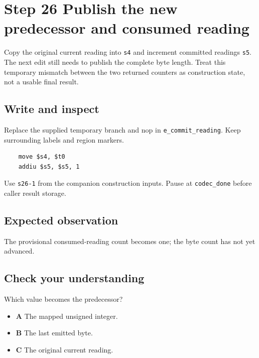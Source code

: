 \section{Step 26 Publish the new predecessor and consumed reading}\label{delta-s26}

Copy the original current reading into \texttt{s4} and increment committed readings \texttt{s5}. The next edit still needs to publish the complete byte length. Treat this temporary mismatch between the two returned counters as construction state, not a usable final result.

\subsection{Write and inspect}
Replace the supplied temporary branch and nop in \texttt{e\_commit\_reading}. Keep surrounding labels and region markers.

\begin{verbatim}
    move $s4, $t0
    addiu $s5, $s5, 1
\end{verbatim}
Use \texttt{s26-1} from the companion construction inputs. Pause at \texttt{codec\_done} before caller result storage.

\subsection{Expected observation}
The provisional consumed-reading count becomes one; the byte count has not yet advanced.

\subsection{Check your understanding}
Which value becomes the predecessor?

\begin{itemize}
  \item \textbf{A} The mapped unsigned integer.
  \item \textbf{B} The last emitted byte.
  \item \textbf{C} The original current reading.
\end{itemize}
